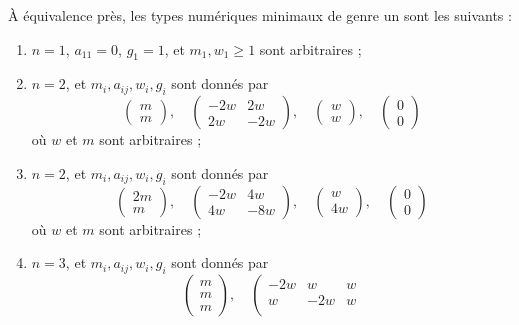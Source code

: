 \begin{lemma}[Genre un]
\label{lemma-genus-one}
À équivalence près, les types numériques minimaux de genre un sont les suivants :
\begin{enumerate}
\item
\label{item-one}
$n = 1$, $a_{11} = 0$, $g_1 = 1$, et $m_1, w_1 \geq 1$ sont arbitraires ;
\item
\label{item-two-cycle}
$n = 2$, et $m_i, a_{ij}, w_i, g_i$ sont donnés par
$$
\left(
\begin{matrix}
m \\
m
\end{matrix}
\right),
\quad
\left(
\begin{matrix}
-2w & 2w \\
2w & -2w
\end{matrix}
\right),
\quad
\left(
\begin{matrix}
w \\
w
\end{matrix}
\right),
\quad
\left(
\begin{matrix}
0 \\
0
\end{matrix}
\right)
$$
où $w$ et $m$ sont arbitraires ;
\item
\label{item-up4}
$n = 2$, et $m_i, a_{ij}, w_i, g_i$ sont donnés par
$$
\left(
\begin{matrix}
2m \\
m
\end{matrix}
\right),
\quad
\left(
\begin{matrix}
-2w & 4w \\
4w & -8w
\end{matrix}
\right),
\quad
\left(
\begin{matrix}
w \\
4w
\end{matrix}
\right),
\quad
\left(
\begin{matrix}
0 \\
0
\end{matrix}
\right)
$$
où $w$ et $m$ sont arbitraires ;
\item
\label{item-three-cycle}
$n = 3$, et $m_i, a_{ij}, w_i, g_i$ sont donnés par
$$
\left(
\begin{matrix}
m \\
m \\
m
\end{matrix}
\right),
\quad
\left(
\begin{matrix}
-2w & w & w \\
w & -2w & w \\

\end{matrix}$$
\end{enumerate}
\end{lemma}
